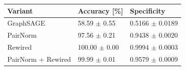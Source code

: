 \begin{tabular}{lll}
\toprule
Variant & Accuracy [\%] & Specificity \\
\midrule
GraphSAGE & 58.59 $\pm$ 0.55 & 0.5166 $\pm$ 0.0189 \\
PairNorm & 97.56 $\pm$ 0.21 & 0.9438 $\pm$ 0.0020 \\
Rewired & 100.00 $\pm$ 0.00 & 0.9994 $\pm$ 0.0003 \\
PairNorm + Rewired & 99.99 $\pm$ 0.01 & 0.9579 $\pm$ 0.0009 \\
\bottomrule
\end{tabular}
